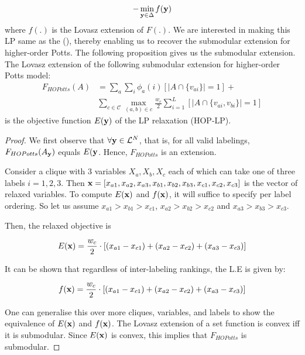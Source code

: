 \begin{align}
    - \min_{{\bf y} \in \Delta} f({\bf y}) 
\end{align}
where $f(.)$ is the Lovasz extension of $F(.)$. We are interested in making
this LP same as the (), thereby enabling us to recover the submodular extension
for higher-order Potts. The following proposition gives us the submodular
extension.
{\proposition The Lovasz extension of the following submodular extension for
  higher-order Potts model:
  \begin{align}
      F_{HOPotts}(A) &= \sum_a \sum_i \phi_{a}(i) [|A \cap \{v_{ai}\}| = 1] + \nonumber \\
        &\sum_{c \in {\mathcal C}} \max_{(a, b) \in c} \frac{w_c}{2} \sum_{i = 1}^L [|A \cap \{v_{ai}, v_{bi}\}| = 1]
\end{align}
is the objective function $E({\bf y})$ of the LP relaxation (HOP-LP).
\label{proposition:hop_extension}}
\begin{proof}
  We first observe that $\forall {\bf y} \in {\mathcal L}^N$, that is, for all
  valid labelings, $F_{HOPotts}(A_{\bf y})$ equals $E({\bf y}$.  Hence, $F_{HOPotts}$
    is an extension. 

Consider a clique with 3 variables $X_a, X_b, X_c$
each of which can take one of three labels $i = 1, 2, 3$. Then ${\bf x}
= [x_{a1}, x_{a2},x_{a3},x_{b1},x_{b2},x_{b3},x_{c1},x_{c2},x_{c3}]$ is the
vector of relaxed variables. To compute $E({\bf x})$ and $f({\bf x})$, it will
suffice to specify per label ordering. So let us assume $x_{a1} > x_{b1}
> x_{c1}$, $x_{a2} > x_{b2} > x_{c2}$ and $x_{a3} > x_{b3} > x_{c3}$.

Then, the relaxed objective is

\begin{equation}
  E({\bf x}) = \frac{w_c}{2} \cdot [(x_{a1} - x_{c1}) + (x_{a2} - x_{c2}) +(x_{a3} - x_{c3})  ]
\end{equation}

It can be shown that regardless of inter-labeling rankings, the L.E is given
by:

\begin{equation}
  f({\bf x}) = \frac{w_c}{2} \cdot [(x_{a1} - x_{c1}) + (x_{a2} - x_{c2}) +(x_{a3} - x_{c3})  ]
\end{equation}

One can generalise this over more cliques, variables, and labels to show the equivalence of $E({\bf x})$ and $f({\bf x})$.
The Lovasz extension of a set function is convex iff it is submodular. Since $E({\bf x})$
is convex, this implies that $F_{HOPotts}$ is submodular. 
\end{proof}

